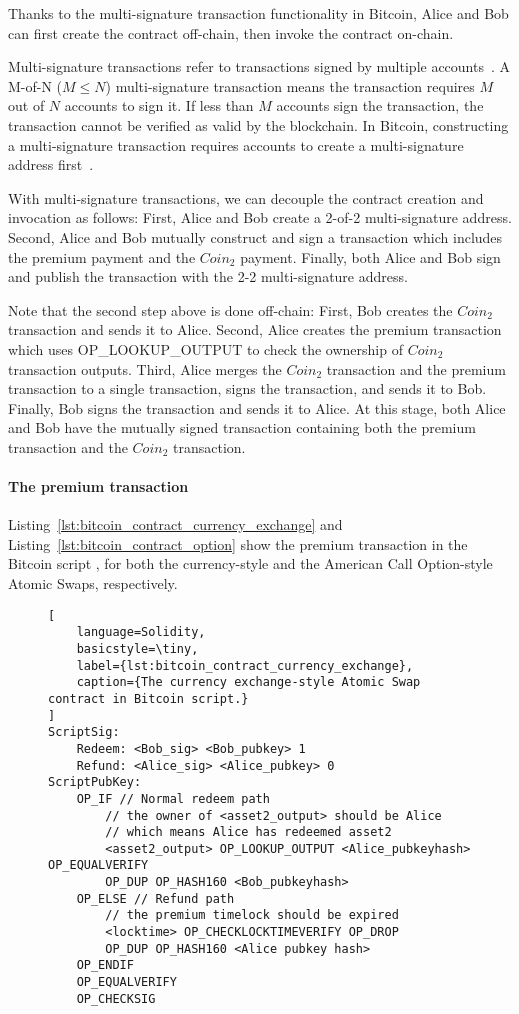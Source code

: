 Thanks to the multi-signature transaction functionality in Bitcoin,
Alice and Bob can first create the contract off-chain, then invoke the contract on-chain.

Multi-signature transactions refer to transactions signed by multiple accounts~\cite{okupski2014bitcoin}.
A M-of-N ($M \leq N$) multi-signature transaction means the transaction requires $M$ out of $N$ accounts to sign it.
If less than $M$ accounts sign the transaction, the transaction cannot be verified as valid by the blockchain.
In Bitcoin, constructing a multi-signature transaction requires accounts to create a multi-signature address first~\cite{okupski2014bitcoin}.

With multi-signature transactions, we can decouple the contract creation and invocation as follows:
First, Alice and Bob create a 2-of-2 multi-signature address. 
Second, Alice and Bob mutually construct and sign a transaction which includes the premium payment and the $Coin_2$ payment.
Finally, both Alice and Bob sign and publish the transaction with the 2-2 multi-signature address.

Note that the second step above is done off-chain:
First, Bob creates the $Coin_2$ transaction and sends it to Alice.
Second, Alice creates the premium transaction which uses OP\_LOOKUP\_OUTPUT to check the ownership of $Coin_2$ transaction outputs.
Third, Alice merges the $Coin_2$ transaction and the premium transaction to a single transaction, signs the transaction, and sends it to Bob.
Finally, Bob signs the transaction and sends it to Alice.
At this stage, both Alice and Bob have the mutually signed transaction containing both the premium transaction and the $Coin_2$ transaction.

\paragraph{The premium transaction}
Listing~\ref{lst:bitcoin_contract_currency_exchange} and Listing~\ref{lst:bitcoin_contract_option} show the premium transaction in the Bitcoin script
, for both the currency-style and the American Call Option-style Atomic Swaps, respectively.

\begin{figure}[htb]
\begin{lstlisting}[
    language=Solidity, 
    basicstyle=\tiny,
    label={lst:bitcoin_contract_currency_exchange},
    caption={The currency exchange-style Atomic Swap contract in Bitcoin script.}
]
ScriptSig:
    Redeem: <Bob_sig> <Bob_pubkey> 1
    Refund: <Alice_sig> <Alice_pubkey> 0
ScriptPubKey:
    OP_IF // Normal redeem path
        // the owner of <asset2_output> should be Alice
        // which means Alice has redeemed asset2
        <asset2_output> OP_LOOKUP_OUTPUT <Alice_pubkeyhash> OP_EQUALVERIFY 
        OP_DUP OP_HASH160 <Bob_pubkeyhash>
    OP_ELSE // Refund path
        // the premium timelock should be expired
        <locktime> OP_CHECKLOCKTIMEVERIFY OP_DROP
        OP_DUP OP_HASH160 <Alice pubkey hash>
    OP_ENDIF
    OP_EQUALVERIFY
    OP_CHECKSIG
\end{lstlisting}  
\end{figure}

